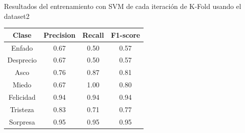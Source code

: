 \documentclass{beamer}
\begin{document}
\begin{frame}{Resultados del entrenamiento con SVM de cada iteración de K-Fold usando el dataset2}
    \begin{table}[h!]
\begin{minipage}{0.48\linewidth}
\centering
\begin{adjustbox}{max width=\textwidth}
\begin{tabular}{|c|c|c|c|}
\hline
\textbf{Clase} & \textbf{Precision} & \textbf{Recall} & \textbf{F1-score}\\
\hline
     Enfado & 0.67 & 0.50 & 0.57\\
     Desprecio & 0.67 & 0.50 & 0.57\\
     Asco & 0.76 & 0.87 & 0.81\\
     Miedo & 0.67 & 1.00 & 0.80\\
     Felicidad & 0.94 & 0.94 & 0.94\\
     Tristeza & 0.83 & 0.71 & 0.77\\
     Sorpresa & 0.95 & 0.95 & 0.95\\
\hline
\end{tabular}
\end{adjustbox}
\vspace{0.4cm}


\end{minipage}
\end{table}
\end{frame}
\end{document}
